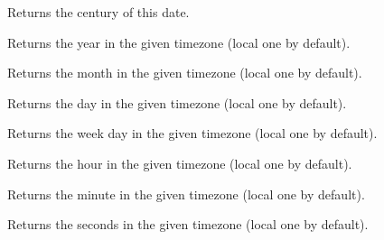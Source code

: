 \label{wxdatetimegetcentury}


Returns the century of this date.


\label{wxdatetimegetyear}


Returns the year in the given timezone (local one by default).


\label{wxdatetimegetmonth}


Returns the month in the given timezone (local one by default).


\label{wxdatetimegetday}


Returns the day in the given timezone (local one by default).


\label{wxdatetimegetweekday}


Returns the week day in the given timezone (local one by default).


\label{wxdatetimegethour}


Returns the hour in the given timezone (local one by default).


\label{wxdatetimegetminute}


Returns the minute in the given timezone (local one by default).


\label{wxdatetimegetsecond}


Returns the seconds in the given timezone (local one by default).


\label{wxdatetimegetmillisecond}

